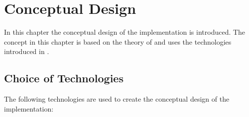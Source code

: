 \chapter{Conceptual Design}
\label{chap:05_design}

In this chapter the conceptual design of the implementation is introduced. The concept in this chapter is based on the theory of  and uses the technologies introduced in .


\section{Choice of Technologies}
\label{sec:05_restrictions}
The following technologies are used to create the conceptual design of the implementation:

